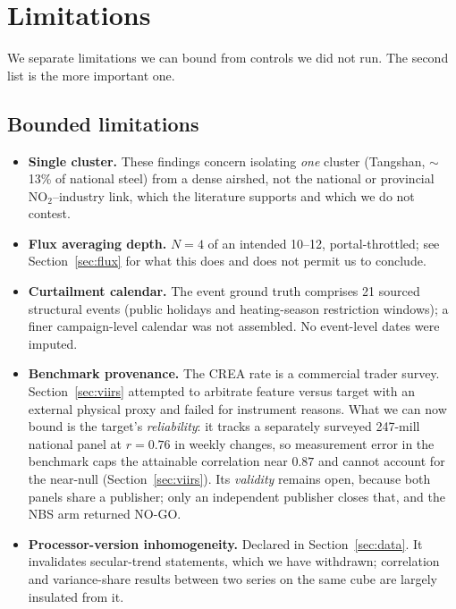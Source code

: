\documentclass[11pt,a4paper]{article}
\newcommand{\rval}[1]{\mbox{$r=#1$}}
\providecommand{\ce}[1]{\ensuremath{\mathrm{#1}}}
\begin{document}
\section{Limitations}
\label{sec:limitations}

We separate limitations we can bound from controls we did not run. The second list is the more
important one.

\subsection{Bounded limitations}

\begin{itemize}[leftmargin=1.4em,itemsep=0.2em]
  \item \textbf{Single cluster.} These findings concern isolating \emph{one} cluster (Tangshan,
  $\sim$13\% of national steel) from a dense airshed, not the national or provincial
  \ce{NO_2}--industry link, which the literature supports \citep{morris_zhang_2019,li_zheng_2023}
  and which we do not contest.
  \item \textbf{Flux averaging depth.} $N{=}4$ of an intended 10--12, portal-throttled; see
  Section~\ref{sec:flux} for what this does and does not permit us to conclude.
  \item \textbf{Curtailment calendar.} The event ground truth comprises 21 sourced structural
  events (public holidays and heating-season restriction windows); a finer campaign-level calendar
  was not assembled. No event-level dates were imputed.
  \item \textbf{Benchmark provenance.} The CREA rate is a commercial trader survey.
  Section~\ref{sec:viirs} attempted to arbitrate feature versus target with an external physical
  proxy and failed for instrument reasons. What we can now bound is the target's
  \emph{reliability}: it tracks a separately surveyed 247-mill national panel at \rval{0.76} in
  weekly changes, so measurement error in the benchmark caps the attainable correlation near
  $0.87$ and cannot account for the near-null (Section~\ref{sec:viirs}). Its \emph{validity}
  remains open, because both panels share a publisher; only an independent publisher closes that,
  and the NBS arm returned NO-GO.
  \item \textbf{Processor-version inhomogeneity.} Declared in Section~\ref{sec:data}. It
  invalidates secular-trend statements, which we have withdrawn; correlation and variance-share
  results between two series on the same cube are largely insulated from it.
\end{itemize}
\end{document}
